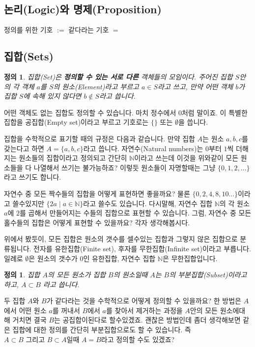\documentclass[a4paper, 11pt]{report}
\renewcommand{\<}{\langle}
\renewcommand{\>}{\rangle}
\newtheorem{dfn}[thm]{정의}
\begin{document}
\subsection{논리(Logic)와 명제(Proposition)}

정의를 위한 기호 $:=$
같다라는 기호 $=$

\subsection{집합(Sets)}

\begin{dfn}
집합(Set)은 \textbf{정의할 수 있는 서로 다른} 객체들의 모임이다. 주어진 집합 $S$안의 각 객체 $a$를 
$S$의 원소(Element)라고 부르고 $a \in S$라고 쓰고, 만약 어떤 객체 $b$가 집합 $S$에 속해
있지 않다면 $b \not\in S$라고 씁니다.
\end{dfn}

어떤 객체도 없는 집합도 정의할 수 있습니다. 마치 정수에서 $0$처럼 말이죠. 이 특별한 
집합을 공집합(Empty set)이라고 부르고 기호로는 $\{\}$ 또는 $\emptyset$을 씁니다.

집합을 수학적으로 표기할 때의 규정은 다음과 같습니다. 만약 집합 $A$는 원소 $a, b, c$를 갖는다고 
하면 $A = \{a, b, c\}$라고 씁니다. 자연수(Natural numbers)는 $0$부터 $1$씩 더해지는 원소들의 
집합이라고 정의되고 간단히 $\mathbb{N}$이라고 쓰는데 이것을 위와같이 모든 원소들을 다 나열해서 
쓰기는 불가능하죠? 이렇듯 원소들이 자명할때는 그냥 $\{0, 1, 2, \ldots\}$라고 쓰기도 합니다.

자연수 중 모든 짝수들의 집합을 어떻게 표현하면 좋을까요? 물론 $\{0, 2, 4, 8, 10\ldots\}$이라고 
쓸수있지만 $\{2a \mid a \in \mathbb{N}\}$라고 쓸수도 있습니다. 다시말해, 자연수 집합 
$\mathbb{N}$의 각 원소 $a$에 $2$를 곱해서 만들어지는 수들의 집합으로 표현할 수 있습니다.
그럼, 자연수 중 모든 홀수들의 집합은 어떻게 표현할 수 있을까요? 각자 생각해봅시다.

위에서 봤듯이, 모든 집합은 원소의 갯수를 셀수있는 집합과 그렇지 않은 집합으로 분류됩니다. 전자를 
유한집합(Finite set), 후자를 무한집합(Infinite set)이라고 부릅니다. 일례로 $\emptyset$은 
원소의 갯수가 $0$인 유한집합, 자연수 집합 $\mathbb{N}$은 무한집합입니다.

\begin{dfn}
  집합 $A$의 모든 원소가 집합 $B$의 원소일때 $A$는 $B$의 부분집합(Subset)이라고 하고, $A \subset B$
  라고 씁니다.
\end{dfn}

두 집합 $A$와 $B$가 같다라는 것을 수학적으로 어떻게 정의할 수 있을까요? 한 방법은 $A$에서 어떤 
원소 $a$를 꺼내서 $B$에서 $a$를 찾아서 제거하는 과정을 $A$안의 모든 원소에대해 거치면 결국
$B$는 공집합이된다로 할수있겠죠. 괜찮은 방법인데 좀더 생각해보면 같은 집합에 대한 정의를 간단히
부분집합으로도 할 수 있습니다. 즉 $A \subset B \text{ 그리고 } B \subset A$일때 $A = B$라고 
정의할 수도 있겠죠?
\end{document}

